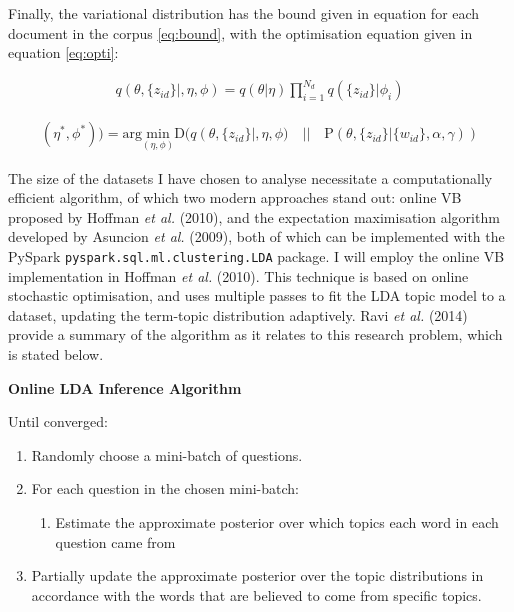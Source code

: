 \documentclass[11pt,preprint, authoryear]{article}
\providecommand{\tightlist}{%
  \setlength{\itemsep}{0pt}\setlength{\parskip}{0pt}}
\begin{document}
Finally, the variational distribution has the bound given in equation
for each document in the corpus \ref{eq:bound}, with the optimisation
equation given in equation \ref{eq:opti}:

\begin{align} \label{eq:bound}
q(\theta, \{z_{id}\}|, \eta, \phi) = q(\theta | \eta) \prod_{i=1}^{N_d} q(\{z_{id}\}|\phi_i)
\end{align}

\begin{align} \label{eq:opti}
(\eta^*, \phi^*)) = \text{arg} \underset{(\eta, \phi)}{\text{min}} \text{D}(q(\theta, \{z_{id}\}|, \eta, \phi) \quad||\quad \text{P}(\theta, \{z_{id}\} | \{w_{id}\}, \alpha, \gamma)) 
\end{align}

The size of the datasets I have chosen to analyse necessitate a
computationally efficient algorithm, of which two modern approaches
stand out: online VB proposed by Hoffman \emph{et al.} (2010), and the
expectation maximisation algorithm developed by Asuncion \emph{et al.}
(2009), both of which can be implemented with the PySpark
\texttt{pyspark.sql.ml.clustering.LDA} package. I will employ the online
VB implementation in Hoffman \emph{et al.} (2010). This technique is
based on online stochastic optimisation, and uses multiple passes to fit
the LDA topic model to a dataset, updating the term-topic distribution
adaptively. Ravi \emph{et al.} (2014) provide a summary of the algorithm
as it relates to this research problem, which is stated below. \newline


\textbf{Online LDA Inference Algorithm}

Until converged:

\begin{enumerate}
\def\labelenumi{\arabic{enumi})}
\item
  Randomly choose a mini-batch of questions.
\item
  For each question in the chosen mini-batch:

  \begin{enumerate}
  \def\labelenumii{\alph{enumii})}
  \tightlist
  \item
    Estimate the approximate posterior over which topics each word in
    each question came from
  \end{enumerate}
\item
  Partially update the approximate posterior over the topic
  distributions in accordance with the words that are believed to come
  from specific topics.
\end{enumerate}
\end{document}

